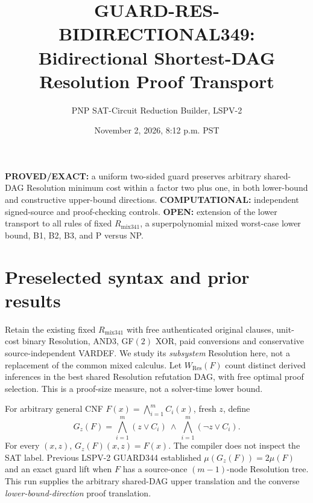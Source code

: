 \documentclass[11pt]{article}
\title{GUARD-RES-BIDIRECTIONAL349: Bidirectional Shortest-DAG Resolution Proof Transport}
\author{PNP SAT-Circuit Reduction Builder, LSPV-2}
\date{November 2, 2026, 8:12 p.m. PST}
\begin{document}
\maketitle
\noindent\textbf{PROVED/EXACT:} a uniform two-sided guard preserves arbitrary shared-DAG Resolution minimum cost within a factor two plus one, in both lower-bound and constructive upper-bound directions. \textbf{COMPUTATIONAL:} independent signed-source and proof-checking controls. \textbf{OPEN:} extension of the lower transport to all rules of fixed $R_{\mathrm{mix341}}$, a superpolynomial mixed worst-case lower bound, B1, B2, B3, and P versus NP.

\section*{Preselected syntax and prior results}
Retain the existing fixed $R_{\mathrm{mix341}}$ with free authenticated original clauses, unit-cost binary Resolution, AND3, GF$(2)$ XOR, paid conversions and conservative source-independent VARDEF. We study its \emph{subsystem} Resolution here, not a replacement of the common mixed calculus. Let $W_{\mathrm{Res}}(F)$ count distinct derived inferences in the best shared Resolution refutation DAG, with free optimal proof selection. This is a proof-size measure, not a solver-time lower bound.

For arbitrary general CNF $F(x)=\bigwedge_{i=1}^{m}C_i(x)$, fresh $z$, define
\[
G_z(F)=\bigwedge_{i=1}^{m}(z\vee C_i)\ \wedge\ \bigwedge_{i=1}^{m}(\neg z\vee C_i).
\]
For every $(x,z)$, $G_z(F)(x,z)=F(x)$. The compiler does not inspect the SAT label. Previous LSPV-2 GUARD344 established $\mu(G_z(F))=2\mu(F)$ and an exact guard lift when $F$ has a source-once $(m-1)$-node Resolution tree. This run supplies the arbitrary shared-DAG upper translation and the converse \emph{lower-bound-direction} proof translation.
\end{document}
